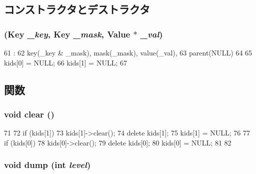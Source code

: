 \subsection{コンストラクタとデストラクタ}
\hypertarget{structTrie_1_1Node_ae9a54cd4b88d09a6cb8f8766baf192c2}{
\subsubsection[{Node}]{ (Key {\em \_\-key}, \/  Key {\em \_\-mask}, \/  Value $\ast$ {\em \_\-val})}}
\label{structTrie_1_1Node_ae9a54cd4b88d09a6cb8f8766baf192c2}



\begin{DoxyCode}
61                                                :
62             key(_key & _mask), mask(_mask), value(_val),
63             parent(NULL)
64         {
65             kids[0] = NULL;
66             kids[1] = NULL;
67         }

\end{DoxyCode}


\subsection{関数}
\hypertarget{structTrie_1_1Node_ac8bb3912a3ce86b15842e79d0b421204}{
\subsubsection[{clear}]{\setlength{\rightskip}{0pt plus 5cm}void clear ()}}
\label{structTrie_1_1Node_ac8bb3912a3ce86b15842e79d0b421204}



\begin{DoxyCode}
71         {
72             if (kids[1]) {
73                 kids[1]->clear();
74                 delete kids[1];
75                 kids[1] = NULL;
76             }
77             if (kids[0]) {
78                 kids[0]->clear();
79                 delete kids[0];
80                 kids[0] = NULL;
81             }
82         }
\end{DoxyCode}
\hypertarget{structTrie_1_1Node_a37b6acc1c1c83ccaa599ef989d0d5e79}{
\subsubsection[{dump}]{\setlength{\rightskip}{0pt plus 5cm}void dump (int {\em level})}}
\label{structTrie_1_1Node_a37b6acc1c1c83ccaa599ef989d0d5e79}



